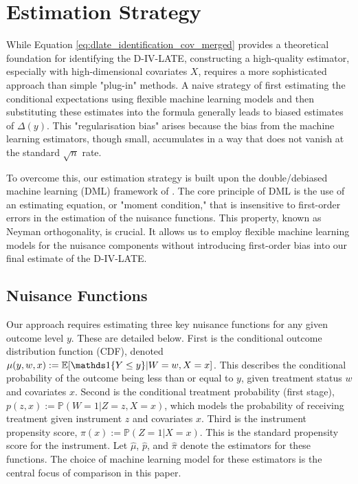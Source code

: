 \documentclass[final,3p,fleqn, 10pt]{elsarticle}
\begin{document}
\section{Estimation Strategy}
\label{sec:estimation}

While Equation \ref{eq:dlate_identification_cov_merged} provides a theoretical foundation for identifying the D-IV-LATE, constructing a high-quality estimator, especially with high-dimensional covariates $X$, requires a more sophisticated approach than simple "plug-in" methods. A naive strategy of first estimating the conditional expectations using flexible machine learning models and then substituting these estimates into the formula generally leads to biased estimates of $\Delta(y)$. This "regularisation bias" arises because the bias from the machine learning estimators, though small, accumulates in a way that does not vanish at the standard $\sqrt{n}$ rate.

To overcome this, our estimation strategy is built upon the double/debiased machine learning (DML) framework of \citet{chernozhukov2018debiased}. The core principle of DML is the use of an estimating equation, or "moment condition," that is insensitive to first-order errors in the estimation of the nuisance functions. This property, known as Neyman orthogonality, is crucial. It allows us to employ flexible machine learning models for the nuisance components without introducing first-order bias into our final estimate of the D-IV-LATE.

\subsection{Nuisance Functions}
Our approach requires estimating three key nuisance functions for any given outcome level $y$. These are detailed below.
First is the conditional outcome distribution function (CDF), denoted $\mu(y, w, x) := \mathbb{E}[\ind\{Y \le y\} | W=w, X=x]$. This describes the conditional probability of the outcome being less than or equal to $y$, given treatment status $w$ and covariates $x$. Second is the conditional treatment probability (first stage), $p(z, x) := \mathbb{P}(W=1 | Z=z, X=x)$, which models the probability of receiving treatment given instrument $z$ and covariates $x$. Third is the instrument propensity score, $\pi(x) := \mathbb{P}(Z=1 | X=x)$. This is the standard propensity score for the instrument.
Let $\hat{\mu}$, $\hat{p}$, and $\hat{\pi}$ denote the estimators for these functions. The choice of machine learning model for these estimators is the central focus of comparison in this paper.
\end{document}
